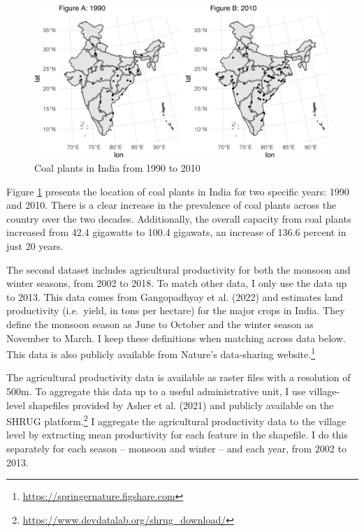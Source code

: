 \documentclass[
]{article}
\begin{document}
\begin{figure}
\includegraphics{draft_files/figure-latex/plants-1} \caption[Coal plants in India from 1990 to 2010]{Coal plants in India from 1990 to 2010}\label{fig:plants}
\end{figure}

Figure \ref{fig:plants} presents the location of coal plants in India for two specific years: 1990 and 2010. There is a clear increase in the prevalence of coal plants across the country over the two decades. Additionally, the overall capacity from coal plants increased from 42.4 gigawatts to 100.4 gigawats, an increase of 136.6 percent in just 20 years.

The second dataset includes agricultural productivity for both the monsoon and winter seasons, from 2002 to 2018. To match other data, I only use the data up to 2013. This data comes from Gangopadhyay et al. (2022) and estimates land productivity (i.e.~yield, in tons per hectare) for the major crops in India. They define the monsoon season as June to October and the winter season as November to March. I keep these definitions when matching across data below. This data is also publicly available from Nature's data-sharing website.\footnote{\url{https://springernature.figshare.com}}

The agricultural productivity data is available as raster files with a resolution of 500m. To aggregate this data up to a useful administrative unit, I use village-level shapefiles provided by Asher et al. (2021) and publicly available on the SHRUG platform.\footnote{\url{https://www.devdatalab.org/shrug_download/}} I aggregate the agricultural productivity data to the village level by extracting mean productivity for each feature in the shapefile. I do this separately for each season -- monsoon and winter -- and each year, from 2002 to 2013.
\end{document}
